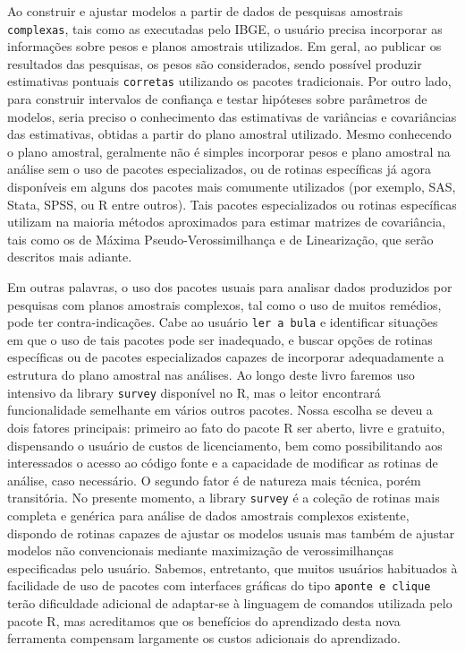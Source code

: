 \documentclass[]{book}
\numberwithin{example}{chapter}
\numberwithin{remark}{chapter}
\numberwithin{definition}{chapter}
\begin{document}
Ao construir e ajustar modelos a partir de dados de pesquisas amostrais
\texttt{complexas}, tais como as executadas pelo IBGE, o usuário precisa
incorporar as informações sobre pesos e planos amostrais utilizados. Em
geral, ao publicar os resultados das pesquisas, os pesos são
considerados, sendo possível produzir estimativas pontuais
\texttt{corretas} utilizando os pacotes tradicionais. Por outro lado,
para construir intervalos de confiança e testar hipóteses sobre
parâmetros de modelos, seria preciso o conhecimento das estimativas de
variâncias e covariâncias das estimativas, obtidas a partir do plano
amostral utilizado. Mesmo conhecendo o plano amostral, geralmente não é
simples incorporar pesos e plano amostral na análise sem o uso de
pacotes especializados, ou de rotinas específicas já agora disponíveis
em alguns dos pacotes mais comumente utilizados (por exemplo, SAS,
Stata, SPSS, ou R entre outros). Tais pacotes especializados ou rotinas
específicas utilizam na maioria métodos aproximados para estimar
matrizes de covariância, tais como os de Máxima Pseudo-Verossimilhança e
de Linearização, que serão descritos mais adiante.

Em outras palavras, o uso dos pacotes usuais para analisar dados
produzidos por pesquisas com planos amostrais complexos, tal como o uso
de muitos remédios, pode ter contra-indicações. Cabe ao usuário
\texttt{ler\ a\ bula} e identificar situações em que o uso de tais
pacotes pode ser inadequado, e buscar opções de rotinas específicas ou
de pacotes especializados capazes de incorporar adequadamente a
estrutura do plano amostral nas análises. Ao longo deste livro faremos
uso intensivo da library \texttt{survey} disponível no R, mas o leitor
encontrará funcionalidade semelhante em vários outros pacotes. Nossa
escolha se deveu a dois fatores principais: primeiro ao fato do pacote R
ser aberto, livre e gratuito, dispensando o usuário de custos de
licenciamento, bem como possibilitando aos interessados o acesso ao
código fonte e a capacidade de modificar as rotinas de análise, caso
necessário. O segundo fator é de natureza mais técnica, porém
transitória. No presente momento, a library \texttt{survey} é a coleção
de rotinas mais completa e genérica para análise de dados amostrais
complexos existente, dispondo de rotinas capazes de ajustar os modelos
usuais mas também de ajustar modelos não convencionais mediante
maximização de verossimilhanças especificadas pelo usuário. Sabemos,
entretanto, que muitos usuários habituados à facilidade de uso de
pacotes com interfaces gráficas do tipo \texttt{aponte\ e\ clique} terão
dificuldade adicional de adaptar-se à linguagem de comandos utilizada
pelo pacote R, mas acreditamos que os benefícios do aprendizado desta
nova ferramenta compensam largamente os custos adicionais do
aprendizado.
\end{document}
